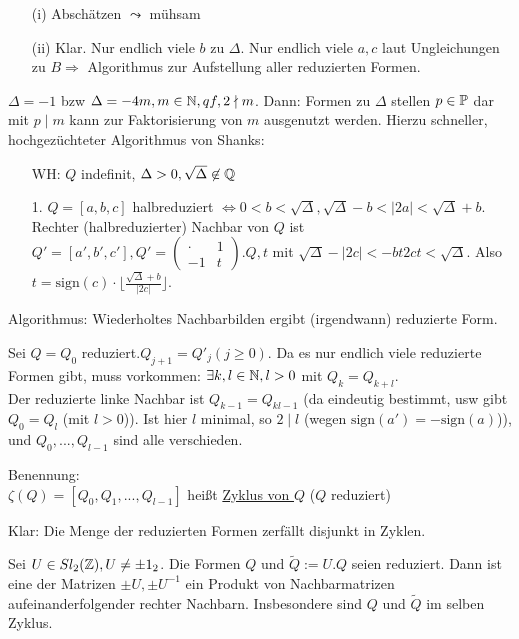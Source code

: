\documentclass[a4paper,DIV15,BCOR12mm]{article}
\begin{document}
\begin{beweis}
\begin{itemize}
\item[(i)] Abschätzen $\leadsto$ mühsam
\item[(ii)] Klar. Nur endlich viele $b$ zu $\Delta$. Nur endlich viele $a,c$ laut Ungleichungen zu $B \Rightarrow$ Algorithmus zur Aufstellung aller reduzierten Formen.
\end{itemize}
\end{beweis}

$\Delta = -1$ bzw $\Delta = -4m, m \in \mathbb{N}, qf, 2 \nmid m$. Dann: Formen zu $\Delta$ stellen $p \in \mathbb{P}$ dar mit $p \mid m$ kann zur Faktorisierung von $m$ ausgenutzt werden. Hierzu schneller, hochgezüchteter Algorithmus von Shanks:
\begin{itemize}
\item[WH:] $Q$ indefinit, $\Delta > 0, \sqrt{\Delta} \not\in \mathbb{Q}$
\item[1.] $Q = [a,b,c]$ halbreduziert $\Leftrightarrow 0 < b < \sqrt{\Delta}, \sqrt{\Delta} - b < |2a| < \sqrt{\Delta} + b$. Rechter (halbreduzierter) Nachbar von $Q$ ist $Q' = [a',b',c'], Q' = \begin{pmatrix}\cdot & 1\\-1 & t\end{pmatrix}.Q, t$ mit $\sqrt{\Delta} - |2c| < -bt2ct < \sqrt{\Delta}$. Also $t = \text{sign}(c)\cdot \lfloor \frac{\sqrt{\Delta} + b}{|2c|} \rfloor$.
\end{itemize}
Algorithmus: Wiederholtes Nachbarbilden ergibt (irgendwann) reduzierte Form. 

Sei $Q = Q_0$ reduziert.$Q_{j+1} = Q'_j (j \ge 0)$. Da es nur endlich viele reduzierte Formen gibt, muss vorkommen: $\exists k,l \in \mathbb{N}, l > 0$ mit $Q_k = Q_{k+l}$. \\
Der reduzierte linke Nachbar ist $Q_{k-1} = Q_{kl-1}$ (da eindeutig bestimmt, usw gibt $Q_0 = Q_l$ (mit $l > 0$)). Ist hier $l$ minimal, so $2 \mid l$ (wegen $\text{sign}(a') = -\text{sign}(a)$)), und $Q_0, ..., Q_{l-1}$ sind alle verschieden.

Benennung:\\
$\zeta(Q) = [Q_0, Q_1,...,Q_{l-1}]$ heißt \underline{Zyklus von $Q$} ($Q$ reduziert)

Klar: Die Menge der reduzierten Formen zerfällt disjunkt in Zyklen.

\begin{satz}
Sei $U \in Sl_2(\mathbb{Z}), U \not= \pm 1_2$. Die Formen $Q$ und $\tilde Q := U.Q$ seien reduziert. Dann ist eine der Matrizen $\pm U, \pm U^{-1}$ ein Produkt von Nachbarmatrizen aufeinanderfolgender rechter Nachbarn. Insbesondere sind $Q$ und $\tilde Q$ im selben Zyklus.
\end{satz}
\end{document}
